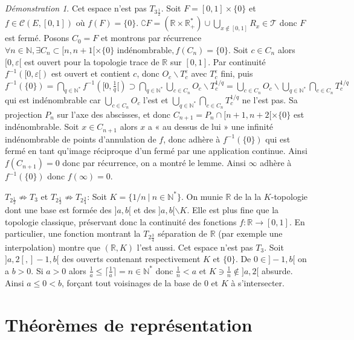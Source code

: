 \documentclass[a4paper, 11pt, french]{book}
\newenvironment{itemise}{\itemize}{\enditemize}
\theoremstyle{plain} %
\theoremstyle{definition} %
\theoremstyle{remark} %
\newtheorem*{demonstration}{Démonstration}
\renewcommand{\setminus}{\backslash}
\newcommand{\1}{\mathds{1}}
\newcommand{\inv}[1]{#1^{-1}}
\newcommand{\N}{\mathbb{N}}
\newcommand{\R}{\mathbb{R}}
\renewcommand{\cal}[1]{\mathcal{#1}}
\newcommand{\scr}[1]{\mathscr{#1}}
\newcommand\ens[2]{\{#1 \ |\ #2\}}
\begin{document}
\begin{demonstration}
\begin{itemise}
		Cet espace n'est pas $T_{3\frac{1}{2}}$.
		Soit $F=[0, 1]\times\{0\}$ et $f\in\cal{C}(E, [0, 1])$ où $f(F)=\{0\}$.
		$\complement F=(\R\times\R_+^*)\cup\bigcup_{x\notin[0, 1]}R_x\in\scr{T}$ donc $F$ est fermé.
		Posons $C_0=F$ et montrons par récurrence $\forall n\in\N, \exists C_n\subset [n, n+1[\times\{0\}\text{ indénombrable}, f(C_n)=\{0\}$.
		Soit $c\in C_n$ alors $[0, \varepsilon[$ est ouvert pour la topologie trace de $\R$ sur $[0, 1]$.
		Par continuité $\inv{f}([0, \varepsilon[)$ est ouvert et contient $c$, donc $O_c\setminus T_c^\varepsilon$ avec $T_c^\varepsilon$ fini, puis $\inv{f}(\{0\})=\bigcap_{q\in\N^*}\inv{f}([0,\frac{1}{q}[)\supset\bigcap_{q\in\N^*}\bigcup_{c\in C_n}O_c\setminus T_c^{1/q}=\bigcup_{c\in C_n}O_c\setminus\bigcup_{q\in\N^*}\bigcap_{c\in C_n}T_c^{1/q}$ qui est indénombrable car $\bigcup_{c\in C_n}O_c$ l'est et $\bigcup_{q\in\N^*}\bigcap_{c\in C_n}T_c^{1/q}$ ne l'est pas.
		Sa projection $P_n$ sur l'axe des abscisses, et donc $C_{n+1}=P_n\cap[n+1, n+2[\times\{0\}$ est indénombrable.
		Soit $x\in C_{n+1}$ alors $x$ a « au dessus de lui » une infinité indénombrable de points d'annulation de $f$, donc adhère à $\inv{f}(\{0\})$ qui est fermé en tant qu'image réciproque d'un fermé par une application continue.
		Ainsi $f(C_{n+1})=0$ donc par récurrence, on a montré le lemme.
		Ainsi $\infty$ adhère à $\inv{f}(\{0\})$ donc $f(\infty)=0$.
		\item[$T_{2\frac{1}{2}}\not\Rightarrow T_3$ et $T_{2\frac{1}{2}}\not\Rightarrow T_{2\frac{3}{4}}$:]
		Soit $K=\ens{1/n}{n\in\N^*}$.
		On munie $\R$ de la la $K$-topologie dont une base est formée des $]a, b[$ et des $]a, b[\setminus K$.
						Elle est plus fine que la topologie classique, préservant donc la continuité des fonctions $f:\R\rightarrow[0, 1]$.
						En particulier, une fonction montrant la $T_{2\frac{3}{4}}$ séparation de $\R$ (par exemple une interpolation) montre que $(\R, K)$ l'est aussi.
						Cet espace n'est pas $T_3$.
						Soit $]a, 2[, ]-1, b[$ des ouverts contenant respectivement $K$ et $\{0\}$.
						De $0\in]-1, b[$ on a $b>0$.
						Si $a>0$ alors $\frac{1}{a}\leqslant \lceil\frac{1}{a}\rceil=n\in\N^*$ donc $\frac{1}{n}<a$ et $K\ni\frac{1}{n}\notin]a, 2[$ absurde.
		Ainsi $a\leqslant0<b$, forçant tout voisinages de la base de $0$ et $K$ à s'intersecter.
	\end{itemise}
\end{demonstration}

\section{Théorèmes de représentation}
\end{document}

